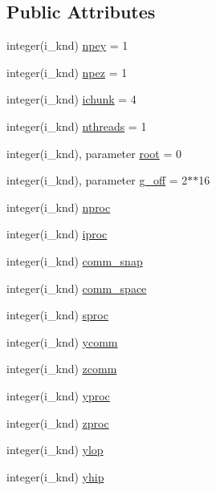 \subsection*{Public Attributes}
\begin{DoxyCompactItemize}
\item 
integer(i\-\_\-knd) \hyperlink{classplib__module_a90134f6aac88ad1d7341e79cbf8426f1}{npey} = 1
\item 
integer(i\-\_\-knd) \hyperlink{classplib__module_ab827d3c46ffc494381bb0962d304561a}{npez} = 1
\item 
integer(i\-\_\-knd) \hyperlink{classplib__module_a0982ec611aac37b53db96a8266ff5c48}{ichunk} = 4
\item 
integer(i\-\_\-knd) \hyperlink{classplib__module_aac4e1911c67e39262528b4ebf471997d}{nthreads} = 1
\item 
integer(i\-\_\-knd), parameter \hyperlink{classplib__module_a4216863984e9df981d4a2d5a51020ce5}{root} = 0
\item 
integer(i\-\_\-knd), parameter \hyperlink{classplib__module_aa3f6bda8ab61c2acbdaf18afe105dbae}{g\-\_\-off} = 2$\ast$$\ast$16
\item 
integer(i\-\_\-knd) \hyperlink{classplib__module_ae01601bf17ba60fbd8ec154182186409}{nproc}
\item 
integer(i\-\_\-knd) \hyperlink{classplib__module_a20a10200b84fc53b3f9703d080eb4f41}{iproc}
\item 
integer(i\-\_\-knd) \hyperlink{classplib__module_a9819445413d7afeb56953bd9fe427854}{comm\-\_\-snap}
\item 
integer(i\-\_\-knd) \hyperlink{classplib__module_aa5bc6028743a524c4466548e276cb839}{comm\-\_\-space}
\item 
integer(i\-\_\-knd) \hyperlink{classplib__module_aa3b6e5883dfa628f71771e9e6ee3e722}{sproc}
\item 
integer(i\-\_\-knd) \hyperlink{classplib__module_af98dd05eb9d15041b5c783c6be090495}{ycomm}
\item 
integer(i\-\_\-knd) \hyperlink{classplib__module_aecf72186ecae9823c0bbe21808acb840}{zcomm}
\item 
integer(i\-\_\-knd) \hyperlink{classplib__module_a75e3d1fe13879374c5966909045b4670}{yproc}
\item 
integer(i\-\_\-knd) \hyperlink{classplib__module_abce2abcf8d84587f2d4a066fa1287d81}{zproc}
\item 
integer(i\-\_\-knd) \hyperlink{classplib__module_a95589a7523a49a05f8af1b39f7e75df8}{ylop}
\item 
integer(i\-\_\-knd) \hyperlink{classplib__module_a5520d897cd8da06d1815c1ec27010cf3}{yhip}
$$
\end{DoxyCompactItemize}
